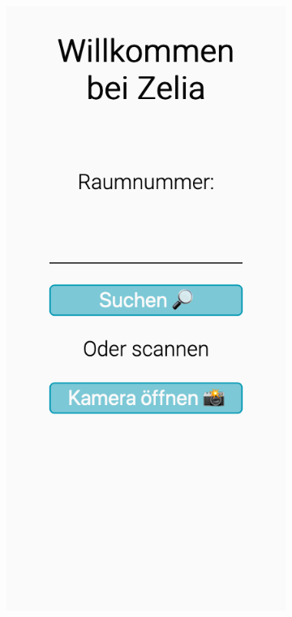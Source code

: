\begin{figure}[H]
    \begin{subfigure}[b]{0.34\textwidth}
        \centering
        \includegraphics[width=\textwidth]{media/ResponsiveDesign/ZeliaHomeMobile.png}

\end{subfigure}
\end{figure}
